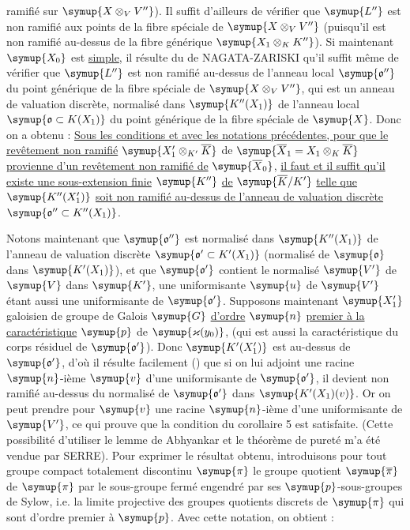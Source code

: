 ramifié sur $\symup{X\otimes_VV''}$). Il suffit d'ailleurs de vérifier que $\symup{L''}$ est
non ramifié aux points de la fibre spéciale de $\symup{X\otimes_VV''}$ (puisqu'il est
non ramifié au-dessus de la fibre générique $\symup{X_1\otimes_KK''}$). Si maintenant
$\symup{X_0}$ est \uline{simple}, il résulte du  de NAGATA-ZARISKI qu'il
suffit même de vérifier que $\symup{L''}$ est non ramifié au-dessus de l'anneau local
$\symup{\mathfrak o''}$ du point générique de la fibre spéciale de $\symup{X\otimes_VV''}$, qui est un
anneau de valuation discrète, normalisé dans $\symup{K''(X_1)}$ de l'anneau local
$\symup{\mathfrak o\subset K(X_1)}$ du point générique de la fibre spéciale de $\symup{X}$. Donc on a
obtenu :
 \uline{Sous les conditions et avec les notations précédentes,
pour que le revêtement non ramifié}
$\symup{X'_1\otimes_{K'}\overline K}$ de
$\symup{\overline X_1=X_1\otimes_K\overline K}$ \uline{provienne d'un revêtement non ramifié
de} $\symup{\overline X_0}$, \uline{il faut et il suffit qu'il existe une sous-extension finie}
$\symup{K''}$ \uline{de} $\symup{\overline K/K'}$ \uline{telle que} $\symup{K''(X'_1)}$ \uline{soit non ramifié au-dessus de
l'anneau de valuation discrète} $\symup{\mathfrak o''\subset K''(X_1)}$.

Notons maintenant que $\symup{\mathfrak o''}$ est normalisé dans $\symup{K''(X_1)}$ de l'anneau de
valuation discrète $\symup{\mathfrak o'\subset K'(X_1)}$ (normalisé de $\symup{\mathfrak o}$ dans $\symup{K'(X_1)}$), et
que $\symup{\mathfrak o'}$ contient le normalisé $\symup{V'}$ de $\symup{V}$ dans $\symup{K'}$, une uniformisante $\symup{u}$ de
$\symup{V'}$ étant aussi une uniformisante de $\symup{\mathfrak o'}$. Supposons maintenant $\symup{X'_1}$
galoisien de groupe de Galois $\symup{G}$ \uline{d'ordre} $\symup{n}$ \uline{premier à la caractéristique} $\symup{p}$
de $\symup{\varkappa(y_0)}$, (qui est aussi la caractéristique du corps résiduel de $\symup{\mathfrak o'}$).
Donc $\symup{K'(X'_1)}$ est  au-dessus de $\symup{\mathfrak o'}$, d'où il résulte
facilement () que si on lui adjoint une racine $\symup{n}$-ième
$\symup{v}$ d'une uniformisante de $\symup{\mathfrak o'}$, il devient non ramifié au-dessus du normalisé
de $\symup{\mathfrak o'}$ dans $\symup{K'(X_1)(v)}$. Or on peut prendre pour $\symup{v}$ une racine $\symup{n}$-ième
d'une uniformisante de $\symup{V'}$, ce qui prouve que la condition du corollaire 5 est
satisfaite. (Cette possibilité d'utiliser le lemme de Abhyankar et le théorème
de pureté m'a été vendue par SERRE). Pour exprimer le résultat obtenu,
introduisons pour tout groupe compact totalement discontinu $\symup{\pi}$ le groupe
quotient $\symup{\overline\pi}$ de $\symup{\pi}$ par le sous-groupe fermé engendré par ses
$\symup{p}$-sous-groupes de Sylow, i.e. la limite projective des groupes quotients
discrets de $\symup{\pi}$ qui sont d'ordre premier à $\symup{p}$. Avec cette notation, on
obtient :

